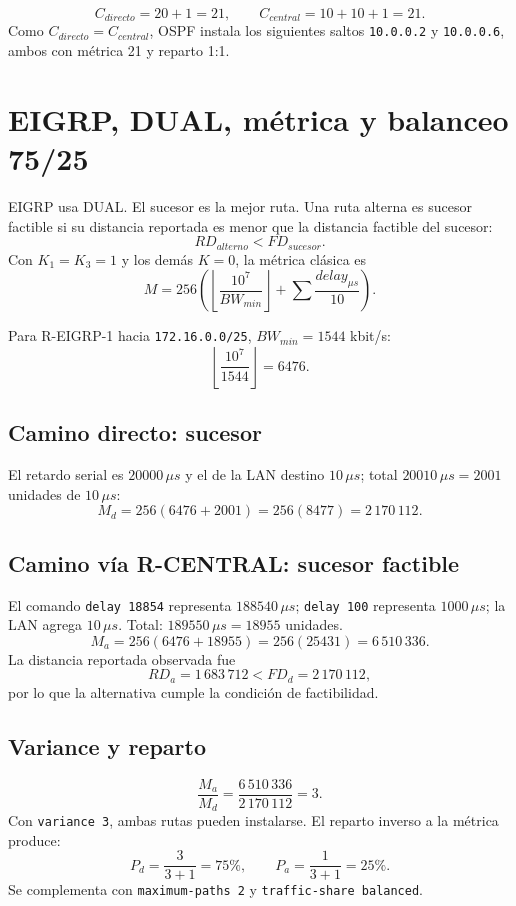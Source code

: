 \documentclass[11pt]{article}
\begin{document}
\begin{calculo}
\[
C_{directo}=20+1=21,
\qquad
C_{central}=10+10+1=21.
\]
Como $C_{directo}=C_{central}$, OSPF instala los siguientes saltos \texttt{10.0.0.2} y \texttt{10.0.0.6}, ambos con métrica 21 y reparto 1:1.
\end{calculo}

\section{EIGRP, DUAL, métrica y balanceo 75/25}

EIGRP usa DUAL. El sucesor es la mejor ruta. Una ruta alterna es sucesor factible si su distancia reportada es menor que la distancia factible del sucesor:
\[
RD_{alterno}<FD_{sucesor}.
\]
Con $K_1=K_3=1$ y los demás $K=0$, la métrica clásica es
\[
M=256\left(\left\lfloor\frac{10^7}{BW_{min}}\right\rfloor+
\sum\frac{delay_{\mu s}}{10}\right).
\]

Para R-EIGRP-1 hacia \texttt{172.16.0.0/25}, $BW_{min}=1544$ kbit/s:
\[
\left\lfloor\frac{10^7}{1544}\right\rfloor=6476.
\]

\subsection{Camino directo: sucesor}
El retardo serial es $20000\,\mu s$ y el de la LAN destino $10\,\mu s$; total $20010\,\mu s=2001$ unidades de $10\,\mu s$:
\[
M_d=256(6476+2001)=256(8477)=\boxed{2\,170\,112}.
\]

\subsection{Camino vía R-CENTRAL: sucesor factible}
El comando \texttt{delay 18854} representa $188540\,\mu s$; \texttt{delay 100} representa $1000\,\mu s$; la LAN agrega $10\,\mu s$. Total: $189550\,\mu s=18955$ unidades.
\[
M_a=256(6476+18955)=256(25431)=\boxed{6\,510\,336}.
\]
La distancia reportada observada fue
\[
RD_a=1\,683\,712<FD_d=2\,170\,112,
\]
por lo que la alternativa cumple la condición de factibilidad.

\subsection{Variance y reparto}
\[
\frac{M_a}{M_d}=\frac{6\,510\,336}{2\,170\,112}=3.
\]
Con \texttt{variance 3}, ambas rutas pueden instalarse. El reparto inverso a la métrica produce:
\[
P_d=\frac{3}{3+1}=75\%,\qquad P_a=\frac{1}{3+1}=25\%.
\]
Se complementa con \texttt{maximum-paths 2} y \texttt{traffic-share balanced}.
\end{document}
